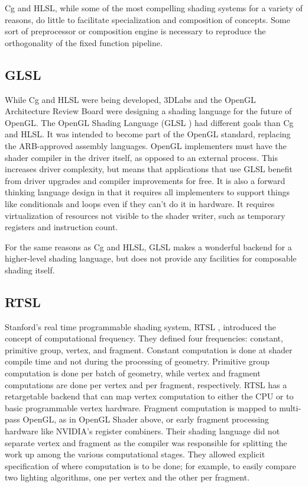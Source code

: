 \documentclass[review]{acmsiggraph}      %
\begin{document}
Cg and HLSL, while some of the most compelling shading systems for a
variety of reasons, do little to facilitate specialization and
composition of concepts.  Some sort of preprocessor or composition
engine is necessary to reproduce the orthogonality of the fixed
function pipeline.


\subsection{GLSL}

While Cg and HLSL were being developed, 3DLabs and the OpenGL
Architecture Review Board were designing a shading language for the
future of OpenGL.  The OpenGL Shading Language (GLSL \cite{RostGLSL})
had different goals than Cg and HLSL.  It was intended to become part
of the OpenGL standard, replacing the ARB-approved assembly languages.
OpenGL implementers must have the shader compiler in the driver
itself, as opposed to an external process.  This increases driver
complexity, but means that applications that use GLSL benefit from
driver upgrades and compiler improvements for free.  It is also a
forward thinking language design in that it requires all implementers
to support things like conditionals and loops even if they can't do it
in hardware.  It requires virtualization of resources not visible to
the shader writer, such as temporary registers and instruction count.

For the same reasons as Cg and HLSL, GLSL makes a wonderful backend
for a higher-level shading language, but does not provide any
facilities for composable shading itself.


\subsection{RTSL}

Stanford's real time programmable shading system, RTSL \cite{rtsl},
introduced the concept of computational frequency.  They defined four
frequencies: constant, primitive group, vertex, and fragment.
Constant computation is done at shader compile time and not during the
processing of geometry.  Primitive group computation is done per batch
of geometry, while vertex and fragment computations are done per
vertex and per fragment, respectively.  RTSL has a retargetable
backend that can map vertex computation to either the CPU or to basic
programmable vertex hardware.  Fragment computation is mapped to
multi-pass OpenGL, as in OpenGL Shader above, or early fragment
processing hardware like NVIDIA's register combiners.  Their shading
language did not separate vertex and fragment as the compiler was
responsible for splitting the work up among the various computational
stages.  They allowed explicit specification of where computation is
to be done; for example, to easily compare two lighting algorithms,
one per vertex and the other per fragment.
\end{document}
